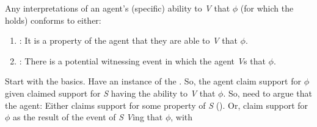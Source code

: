 \begin{note}[Exhaustive]
  \begin{proposition}\label{prop:WR-and-AR-exhaustive}\label{either-AR-or-WR}
    Any interpretations of an agent's (specific) ability to \emph{V} that \(\phi\) (for which the \aben{} holds) conforms to either:
    \begin{enumerate}
    \item \AR{}: It is a property of the agent that they are able to \emph{V} that \(\phi\).
    \item \WR{}: There is a potential witnessing event in which the agent \emph{V}s that \(\phi\).
    \end{enumerate}
    \vspace{-\topsep}\vspace{-\topsep}
  \end{proposition}
\end{note}

\begin{note}[Argument]
  \color{red}
  Start with the basics.
  Have an instance of the \aben{}.
  So, the agent claim support for \(\phi\) given claimed support for \emph{S} having the ability to \emph{V} that \(\phi\).
  So, need to argue that the agent:
  Either claims support for some property of \emph{S} (\AR{}).
  Or, claim support for \(\phi\) as the result of the event of \emph{S} \emph{V}ing that \(\phi\), with 
\end{note}

